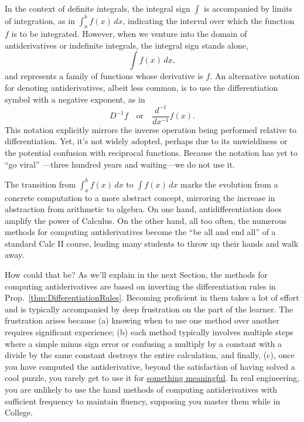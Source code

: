 In the context of definite integrals, the integral sign  \(\int\) is accompanied by limits of integration, as in \(\int_a^b f(x) \, dx\), indicating the interval over which the function \(f\) is to be integrated. However, when we venture into the domain of antiderivatives or indefinite integrals, the integral sign stands alone, 
\[ \int f(x) \, dx,\] 
and represents a family of functions whose derivative is \(f\). An alternative notation for denoting antiderivatives, albeit less common, is to use the differentiation symbol with a negative exponent, as in 
\[ D^{-1}f ~~~\text{  or  } ~~~\frac{d^{-1}}{dx^{-1}} f(x). \] 
This notation explicitly mirrors the inverse operation being performed relative to differentiation. Yet, it's not widely adopted, perhaps due to its unwieldiness or the potential confusion with reciprocal functions. Because the notation has yet to ``go viral'' ---three hundred years and waiting---we do not use it.

The transition from \(\int_a^b f(x) \, dx\) to \(\int f(x) \, dx\) marks the evolution from a concrete computation to a more abstract concept, mirroring the increase in abstraction from arithmetic to algebra. On one hand, antidifferentiation does amplify the power of Calculus. On the other hand, all too often, the numerous methods for computing antiderivatives become the ``be all and end all'' of a standard Calc II course, leading many students to throw up their hands and walk away. 

How could that be? As we'll explain in the next Section, the methods for computing antiderivatives are based on inverting the differentiation rules in Prop.~\ref{thm:DifferentiationRules}. Becoming proficient in them takes a lot of effort and is typically accompanied by deep frustration on the part of the learner. The frustration arises because (a) knowing when to use one method over another requires significant experience; (b) each method typically involves multiple steps where a simple minus sign error or confusing a multiply by a constant with a divide by the same constant destroys the entire calculation, and finally, (c), once you have computed the antiderivative, beyond the satisfaction of having solved a cool puzzle, you rarely get to use it for \href{https://youtu.be/69xFhaUFKk0}{something meaningful}. In real engineering, you are unlikely to use the hand methods of computing antiderivatives with sufficient frequency to maintain fluency, supposing you master them while in College.  \\


